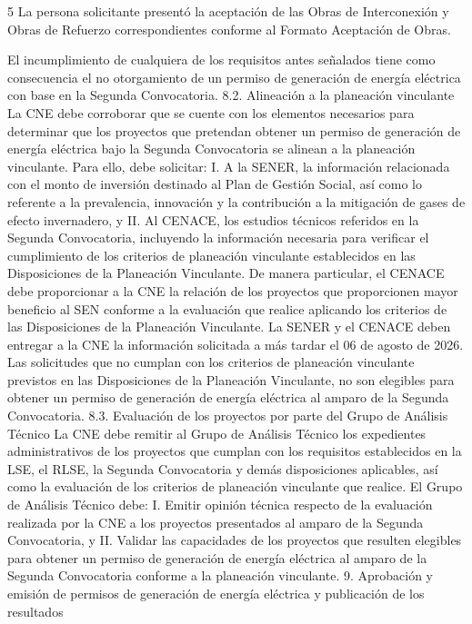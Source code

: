  
 5
 La persona solicitante presentó la aceptación de las Obras de Interconexión y Obras de Refuerzo correspondientes conforme al Formato Aceptación de Obras.
 
 
 
El incumplimiento de cualquiera de los requisitos antes señalados tiene como consecuencia el no otorgamiento de un permiso de generación de energía eléctrica con base en la Segunda Convocatoria.
8.2. Alineación a la planeación vinculante
La CNE debe corroborar que se cuente con los elementos necesarios para determinar que los proyectos que pretendan obtener un permiso de generación de energía eléctrica bajo la Segunda Convocatoria se alinean a la planeación vinculante. Para ello, debe solicitar:
I. A la SENER, la información relacionada con el monto de inversión destinado al Plan de Gestión Social, así como lo referente a la prevalencia, innovación y la contribución a la mitigación de gases de efecto invernadero, y
II. Al CENACE, los estudios técnicos referidos en la Segunda Convocatoria, incluyendo la información necesaria para verificar el cumplimiento de los criterios de planeación vinculante establecidos en las Disposiciones de la Planeación Vinculante. De manera particular, el CENACE debe proporcionar a la CNE la relación de los proyectos que proporcionen mayor beneficio al SEN conforme a la evaluación que realice aplicando los criterios de las Disposiciones de la Planeación Vinculante.
La SENER y el CENACE deben entregar a la CNE la información solicitada a más tardar el 06 de agosto de 2026.
Las solicitudes que no cumplan con los criterios de planeación vinculante previstos en las Disposiciones de la Planeación Vinculante, no son elegibles para obtener un permiso de generación de energía eléctrica al amparo de la Segunda Convocatoria.
8.3. Evaluación de los proyectos por parte del Grupo de Análisis Técnico
La CNE debe remitir al Grupo de Análisis Técnico los expedientes administrativos de los proyectos que cumplan con los requisitos establecidos en la LSE, el RLSE, la Segunda Convocatoria y demás disposiciones aplicables, así como la evaluación de los criterios de planeación vinculante que realice.
El Grupo de Análisis Técnico debe:
I. Emitir opinión técnica respecto de la evaluación realizada por la CNE a los proyectos presentados al amparo de la Segunda Convocatoria, y
II. Validar las capacidades de los proyectos que resulten elegibles para obtener un permiso de generación de energía eléctrica al amparo de la Segunda Convocatoria conforme a la planeación vinculante.
9. Aprobación y emisión de permisos de generación de energía eléctrica y publicación de los resultados
